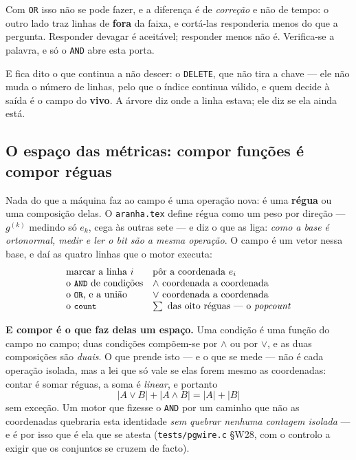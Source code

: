 \documentclass[11pt,a4paper]{article}
\newcommand{\code}[1]{\texttt{\small #1}}
\begin{document}
\medskip\noindent Com \code{OR} isso não se pode fazer, e a diferença é de
\emph{correção} e não de tempo: o outro lado traz linhas de \textbf{fora} da
faixa, e cortá-las responderia menos do que a pergunta. Responder devagar é
aceitável; responder menos não é. Verifica-se a palavra, e só o \code{AND} abre
esta porta.

\medskip\noindent E fica dito o que continua a não descer: o \code{DELETE}, que
não tira a chave --- ele não muda o número de linhas, pelo que o índice
continua válido, e quem decide à saída é o campo do \textbf{vivo}. A árvore diz
onde a linha estava; ele diz se ela ainda está.

\subsection*{O espaço das métricas: compor funções é compor réguas}

\noindent Nada do que a máquina faz ao campo é uma operação nova: é uma
\textbf{régua} ou uma composição delas. O \code{aranha.tex} define régua como
um peso por direção --- $g^{(k)}$ medindo só $e_k$, cega às outras sete --- e
diz o que as liga: \emph{como a base é ortonormal, medir e ler o bit são a
mesma operação}. O campo é um vetor nessa base, e daí as quatro linhas que o
motor executa:
\[
\begin{array}{ll}
\text{marcar a linha }i & \text{pôr a coordenada } e_i\\
\text{o \code{AND} de condições} & \wedge\ \text{coordenada a coordenada}\\
\text{o \code{OR}, e a união} & \vee\ \text{coordenada a coordenada}\\
\text{o \code{count}} & \textstyle\sum\ \text{das oito réguas --- o \emph{popcount}}
\end{array}
\]

\medskip\noindent\textbf{E compor é o que faz delas um espaço.} Uma condição é
uma função do campo no campo; duas condições compõem-se por $\wedge$ ou por
$\vee$, e as duas composições são \emph{duais}. O que prende isto --- e o que se
mede --- não é cada operação isolada, mas a lei que só vale se elas forem mesmo
as coordenadas: contar é somar réguas, a soma é \emph{linear}, e portanto
\[
\boxed{\;\lvert A\vee B\rvert+\lvert A\wedge B\rvert=\lvert A\rvert+\lvert B\rvert\;}
\]
sem exceção. Um motor que fizesse o \code{AND} por um caminho que não as
coordenadas quebraria esta identidade \emph{sem quebrar nenhuma contagem
isolada} --- e é por isso que é ela que se atesta (\code{tests/pgwire.c} §W28,
com o controlo a exigir que os conjuntos se cruzem de facto).
\end{document}
